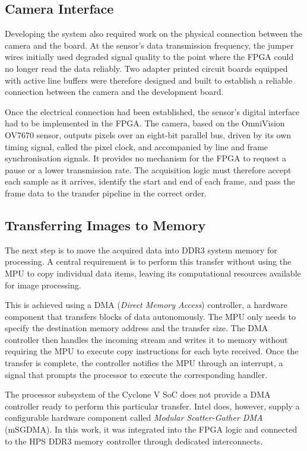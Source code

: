\subsection{Camera Interface}

Developing the system also required work on the physical connection between the camera and the board. At the sensor's data transmission frequency, the jumper wires initially used degraded signal quality to the point where the FPGA could no longer read the data reliably. Two adapter printed circuit boards equipped with active line buffers were therefore designed and built to establish a reliable connection between the camera and the development board.

Once the electrical connection had been established, the sensor's digital interface had to be implemented in the FPGA. The camera, based on the OmniVision OV7670 sensor, outputs pixels over an eight-bit parallel bus, driven by its own timing signal, called the pixel clock, and accompanied by line and frame synchronisation signals. It provides no mechanism for the FPGA to request a pause or a lower transmission rate. The acquisition logic must therefore accept each sample as it arrives, identify the start and end of each frame, and pass the frame data to the transfer pipeline in the correct order.

\subsection{Transferring Images to Memory}

The next step is to move the acquired data into DDR3 system memory for processing. A central requirement is to perform this transfer without using the MPU to copy individual data items, leaving its computational resources available for image processing.

This is achieved using a DMA (\emph{Direct Memory Access}) controller, a hardware component that transfers blocks of data autonomously. The MPU only needs to specify the destination memory address and the transfer size. The DMA controller then handles the incoming stream and writes it to memory without requiring the MPU to execute copy instructions for each byte received. Once the transfer is complete, the controller notifies the MPU through an interrupt, a signal that prompts the processor to execute the corresponding handler.

The processor subsystem of the Cyclone V SoC does not provide a DMA controller ready to perform this particular transfer. Intel does, however, supply a configurable hardware component called \emph{Modular Scatter-Gather DMA} (mSGDMA). In this work, it was integrated into the FPGA logic and connected to the HPS DDR3 memory controller through dedicated interconnects.

